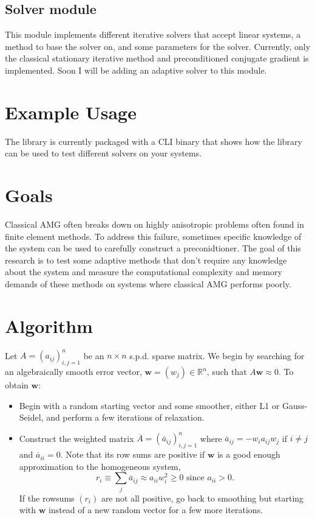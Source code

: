\documentclass[a4paper,12pt]{amsart}
\numberwithin{equation}{section}
\def\bw{{\mathbf w}}
\begin{document}
\subsection{Solver module}
This module implements different iterative solvers that accept linear systems, a
method to base the solver on, and some parameters for the solver. Currently, only
the classical stationary iterative method and preconditioned conjugate gradient is
implemented. Soon I will be adding an adaptive solver to this module.

\section{Example Usage}
The library is currently packaged with a CLI binary that shows how the library
can be used to test different solvers on your systems.

\section{Goals}
Classical AMG often breaks down on highly anisotropic problems often found in finite
element methods. To address this failure, sometimes specific knowledge of the system
can be used to carefully construct a preconidtioner. The goal of this research is to
test some adaptive methods that don't require any knowledge about the system and
measure the computational complexity and memory demands of these methods on systems
where classical AMG performs poorly.

\section{Algorithm}
Let $A = (a_{ij})^n_{i,j=1}$ be an $n \times n$  s.p.d. sparse matrix. We begin by searching
for an algebraically smooth error vector, $\bw = (w_j)  \in {\mathbb R}^n$,
such that $A \bw \approx 0$. To obtain $\bw$:
\begin{itemize}
   \item Begin with a random starting vector and some smoother, either L1 or Gauss-Seidel,
      and perform a few iterations of relaxation. 
   \item Construct the weighted matrix ${\overline A} = ({\overline a}_{ij})^n_{i,j=1}$ where
      ${\overline a}_{ij} = - w_i a_{ij}w_j$ if $i \ne j$ and ${\overline a}_{ii} = 0.$
      Note that its row sums are positive if $\bw$ is a good enough approximation to the 
      homogeneous system,
      \begin{equation*}
         r_i \equiv \sum\limits_j{\overline a}_{ij} \approx  a_{ii} w^2_i \ge 0 \text{ since } a_{ii} >0.
      \end{equation*}
      If the rowsums $(r_i)$ are not all positive, go back to smoothing but starting with $\bw$ instead
      of a new random vector for a few more iterations. 
\end{itemize}
\end{document}
